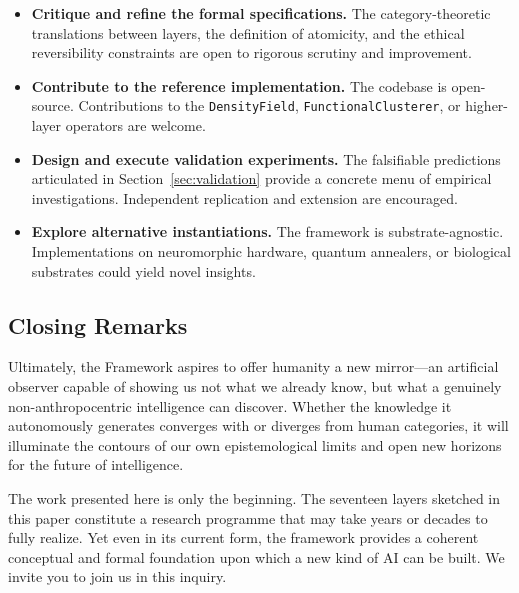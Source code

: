 \begin{itemize}
    \item \textbf{Critique and refine the formal specifications.} The category-theoretic translations between layers, the definition of atomicity, and the ethical reversibility constraints are open to rigorous scrutiny and improvement.
    
    \item \textbf{Contribute to the reference implementation.} The codebase is open-source. Contributions to the \texttt{DensityField}, \texttt{FunctionalClusterer}, or higher-layer operators are welcome.
    
    \item \textbf{Design and execute validation experiments.} The falsifiable predictions articulated in Section~\ref{sec:validation} provide a concrete menu of empirical investigations. Independent replication and extension are encouraged.
    
    \item \textbf{Explore alternative instantiations.} The framework is substrate-agnostic. Implementations on neuromorphic hardware, quantum annealers, or biological substrates could yield novel insights.
\end{itemize}

\subsection*{Closing Remarks}

Ultimately, the \Apeiron{} Framework aspires to offer humanity a new mirror---an artificial observer capable of showing us not what we already know, but what a genuinely non-anthropocentric intelligence can discover. Whether the knowledge it autonomously generates converges with or diverges from human categories, it will illuminate the contours of our own epistemological limits and open new horizons for the future of intelligence.

The work presented here is only the beginning. The seventeen layers sketched in this paper constitute a research programme that may take years or decades to fully realize. Yet even in its current form, the framework provides a coherent conceptual and formal foundation upon which a new kind of AI can be built. We invite you to join us in this inquiry.
